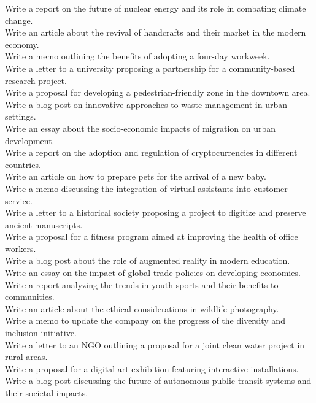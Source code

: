 \begin{examplebox}
Write a report on the future of nuclear energy and its role in combating climate change. \\
Write an article about the revival of handcrafts and their market in the modern economy. \\
Write a memo outlining the benefits of adopting a four-day workweek. \\
Write a letter to a university proposing a partnership for a community-based research project. \\
Write a proposal for developing a pedestrian-friendly zone in the downtown area. \\
Write a blog post on innovative approaches to waste management in urban settings. \\
Write an essay about the socio-economic impacts of migration on urban development. \\
Write a report on the adoption and regulation of cryptocurrencies in different countries. \\
Write an article on how to prepare pets for the arrival of a new baby. \\
Write a memo discussing the integration of virtual assistants into customer service. \\
Write a letter to a historical society proposing a project to digitize and preserve ancient manuscripts. \\
Write a proposal for a fitness program aimed at improving the health of office workers. \\
Write a blog post about the role of augmented reality in modern education. \\
Write an essay on the impact of global trade policies on developing economies. \\
Write a report analyzing the trends in youth sports and their benefits to communities. \\
Write an article about the ethical considerations in wildlife photography. \\
Write a memo to update the company on the progress of the diversity and inclusion initiative. \\
Write a letter to an NGO outlining a proposal for a joint clean water project in rural areas. \\
Write a proposal for a digital art exhibition featuring interactive installations. \\
Write a blog post discussing the future of autonomous public transit systems and their societal impacts.
\end{examplebox}

